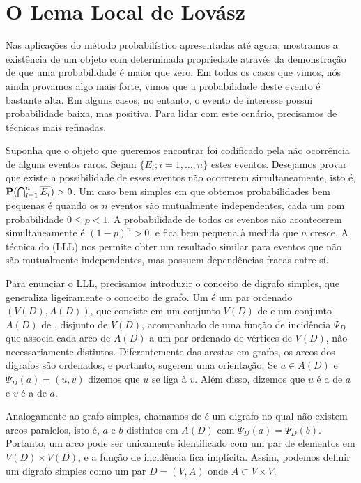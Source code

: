 
\section{O Lema Local de Lovász}


Nas aplicações do método probabilístico apresentadas até agora, mostramos a existência de um objeto com determinada propriedade através da demonstração de que uma probabilidade é maior que zero. Em todos os casos que vimos, nós ainda provamos algo mais forte, vimos que a probabilidade deste evento é bastante alta. Em alguns casos, no entanto, o evento de interesse possui probabilidade baixa, mas positiva. Para lidar com este cenário, precisamos de técnicas mais refinadas.

Suponha que o objeto que queremos encontrar foi codificado pela não ocorrência de alguns eventos raros. Sejam $\{E_i; i = 1,\dots,n\}$ estes eventos. Desejamos provar que existe a possibilidade de esses eventos não ocorrerem simultaneamente, isto é,  $\operatorname{\mathbf{P}}(\bigcap_{i=1}^n \overline{E_i}) > 0$. Um caso bem simples em que obtemos probabilidades bem pequenas é quando os $n$ eventos são mutualmente independentes, cada um com probabilidade $0 \leq p<1$. A probabilidade de todos os eventos não acontecerem simultaneamente é $(1-p)^n > 0$, e fica bem pequena à medida que $n$ cresce. A técnica do  (LLL) nos permite obter um resultado similar para eventos que não são mutualmente independentes, mas possuem dependências fracas entre sí.

Para enunciar o LLL, precisamos introduzir o conceito de digrafo simples, que generaliza ligeiramente o conceito de grafo. Um  é um par ordenado $(V(D), A(D))$, que consiste em um conjunto $V(D)$ de  e um conjunto $A(D)$ de , disjunto de $V(D)$, acompanhado de uma função de incidência $\Psi_D$ que associa cada arco de $A(D)$ a um par ordenado de vértices de $V(D)$, não necessariamente distintos. Diferentemente das arestas em grafos, os arcos dos digrafos são ordenados, e portanto, sugerem uma orientação. Se $a \in A(D)$ e $\Psi_D(a) = (u,v)$ dizemos que $u$ se liga à $v$. Além disso, dizemos que $u$ é a  de $a$ e $v$ é a  de $a$.

Analogamente ao grafo simples, chamamos de  é um digrafo no qual não existem arcos paralelos, isto é, $a$ e $b$ distintos em $A(D)$ com $\Psi_D(a) = \Psi_D(b)$. Portanto, um arco pode ser unicamente identificado com um par de elementos em $V(D) \times V(D)$, e a função de incidência fica implícita. Assim, podemos definir um digrafo simples como um par $D = (V,A)$ onde $A \subset V\times V$.

